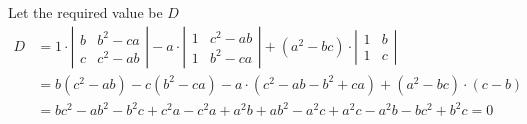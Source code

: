 \begin{solution}
    \begin{fullwidth}
    Let the required value be $D$
	\begin{align}
	  D &= 1\cdot\left|
	    \begin{array}{cc}
	      b & b^2-ca \\
	      c & c^2-ab
	    \end{array}
	  \right| - a\cdot \left|
	    \begin{array}{cc}
	      1 & c^2-ab \\
	      1 & b^2-ca
	    \end{array}
	  \right| + (a^2-bc)\cdot\left|
	    \begin{array}{cc}
	      1 & b \\
	      1 & c
	    \end{array}
	  \right| \\
	  &= b(c^2-ab) - c(b^2-ca) -a\cdot(c^2-ab-b^2+ca) + (a^2-bc)\cdot(c-b) \\
	  &= bc^2-ab^2-b^2c+c^2a-c^2a+a^2b+ab^2-a^2c+a^2c-a^2b-bc^2+b^2c = 0
	\end{align}
	\end{fullwidth}
\end{solution}
